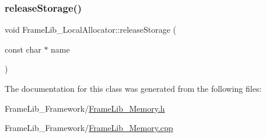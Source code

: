 \mbox{\label{class_frame_lib___local_allocator_a5bbca2317e172ec8afa22be33a70d748}} 
\subsubsection{\texorpdfstring{release\+Storage()}{releaseStorage()}}
{\footnotesize\ttfamily void Frame\+Lib\+\_\+\+Local\+Allocator\+::release\+Storage (\begin{DoxyParamCaption}\item[{const char $\ast$}]{name }\end{DoxyParamCaption})}



The documentation for this class was generated from the following files\+:\begin{DoxyCompactItemize}
\item 
Frame\+Lib\+\_\+\+Framework/\hyperlink{_frame_lib___memory_8h}{Frame\+Lib\+\_\+\+Memory.\+h}\item 
Frame\+Lib\+\_\+\+Framework/\hyperlink{_frame_lib___memory_8cpp}{Frame\+Lib\+\_\+\+Memory.\+cpp}\end{DoxyCompactItemize}
